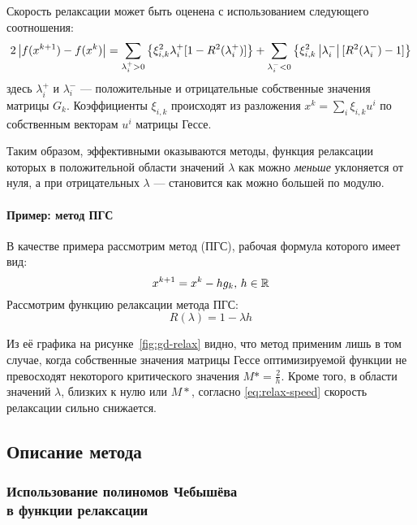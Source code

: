 

Скорость релаксации может быть оценена с использованием следующего
соотношения:
\begin{equation}
  \label{eq:relax-speed}
  2\left \lvert{f(x^{k+1})-f(x^k)}\right \rvert=\sum_{\lambda_i^+>0} \left\{\xi_{i,k}^2
    \lambda_i^+ [1-R^2(\lambda_i^+)]\right\} + \sum_{\lambda_i^-<0} \left\{\xi_{i,k}^2
    \left \lvert{\lambda_i^-}\right \rvert [R^2(\lambda_i^-)-1]\right\}
\end{equation}
здесь $\lambda_i^+$ и $\lambda_i^-$ — положительные и отрицательные
собственные значения матрицы $G_k$. Коэффициенты $\xi_{i,k}$
происходят из разложения $x^k=\sum_i{\xi_{i,k}u^i}$ по собственным
векторам $u^i$ матрицы Гессе.

Таким образом, эффективными оказываются методы, функция релаксации
которых в положительной области значений $\lambda$ как можно
\emph{меньше} уклоняется от нуля, а при отрицательных $\lambda$ —
становится как можно большей по модулю.

\paragraph{Пример: метод ПГС}

В качестве примера рассмотрим метод  (ПГС), рабочая формула которого имеет вид:
\begin{equation*}
  x^{k+1}=x^k-hg_k,\, h\in\mathbb{R}
\end{equation*}
Рассмотрим функцию релаксации метода ПГС:
\begin{equation}
  \label{eq:gd-relax}
  R(\lambda) = 1 - \lambda h
\end{equation}



Из её графика на рисунке \ref{fig:gd-relax} видно, что метод применим
лишь в том случае, когда собственные значения матрицы Гессе
оптимизируемой функции не превосходят некоторого критического значения
$M*=\frac{2}{h}$. Кроме того, в области значений $\lambda$, близких к
нулю или $M*$, согласно \eqref{eq:relax-speed} скорость релаксации
сильно снижается.

\subsection{Описание метода}

\subsubsection{Использование полиномов Чебышёва\\
  в функции релаксации}


